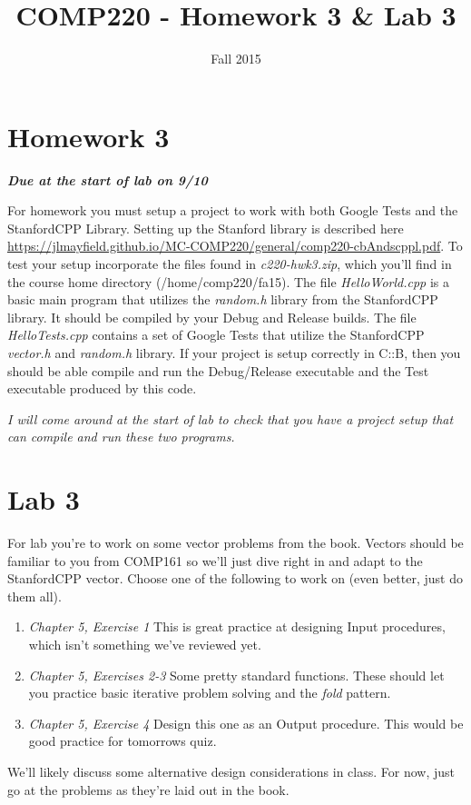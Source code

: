 \documentclass[10pt]{article}
\title{COMP220 - Homework 3 \& Lab 3}
\author{ }
\date{Fall 2015}
\begin{document}
\maketitle

\begin{abstract}

\end{abstract}

\section{Homework 3}

\begin{center}
\textbf{\textit{Due at the start of lab on 9/10}}
\end{center}

For homework you must setup a project to work with both Google Tests and the StanfordCPP Library. Setting up the Stanford library is described here \url{https://jlmayfield.github.io/MC-COMP220/general/comp220-cbAndscppl.pdf}. To test your setup incorporate the files found in \textit{c220-hwk3.zip}, which you'll find in the course home directory (/home/comp220/fa15). The file \textit{HelloWorld.cpp} is a basic main program that utilizes the \textit{random.h} library from the StanfordCPP library. It should be compiled by your Debug and Release builds.  The file \textit{HelloTests.cpp} contains a set of Google Tests that utilize the StanfordCPP \textit{vector.h} and \textit{random.h} library. If your project is setup correctly in C::B, then you should be able compile and run the Debug/Release executable and the Test executable produced by this code. 

\textit{I will come around at the start of lab to check that you have a project setup that can compile and run these two programs.}

\section{Lab 3}

For lab you're to work on some vector problems from the book. Vectors should be familiar to you from COMP161 so we'll just dive right in and adapt to the StanfordCPP vector. Choose one of the following to work on (even better, just do them all). 
\begin{enumerate}
\item \textit{Chapter 5, Exercise 1} This is great practice at designing Input procedures, which isn't something we've reviewed yet. 
\item \textit{Chapter 5, Exercises 2-3} Some pretty standard functions. These should let you practice basic iterative problem solving and the \textit{fold} pattern.
\item \textit{Chapter 5, Exercise 4} Design this one as an Output procedure. This would be good practice for tomorrows quiz.
\end{enumerate}
We'll likely discuss some alternative design considerations in class. For now, just go at the problems as they're laid out in the book.
\end{document}
